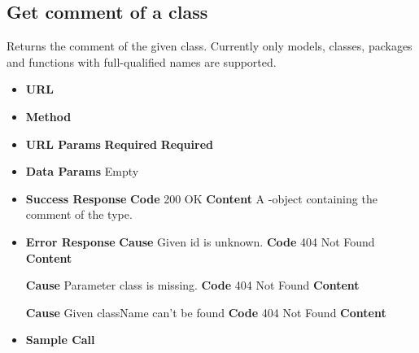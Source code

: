 \subsection{Get comment of a class}
Returns the comment of the given class.
Currently only models, classes, packages and functions with full-qualified names are supported.
\begin{itemize}
\item \textbf{URL} 
\item \textbf{Method} 

\item \textbf{URL Params}
  \newline\textbf{Required} 
  \newline\textbf{Required} 

\item \textbf{Data Params} Empty

\item \textbf{Success Response}
  \newline\textbf{Code} 200 OK
  \newline\textbf{Content} A -object containing the comment of the type.

\item \textbf{Error Response}
  \newline\textbf{Cause} Given id is unknown.
  \newline\textbf{Code} 404 Not Found
  \newline\textbf{Content} 

  \fixedspace\textbf{Cause} Parameter class is missing.
  \newline\textbf{Code} 404 Not Found
  \newline\textbf{Content} 

  \fixedspace\textbf{Cause} Given className can't be found
  \newline\textbf{Code} 404 Not Found
  \newline\textbf{Content} 

\item \textbf{Sample Call}
\end{itemize}
